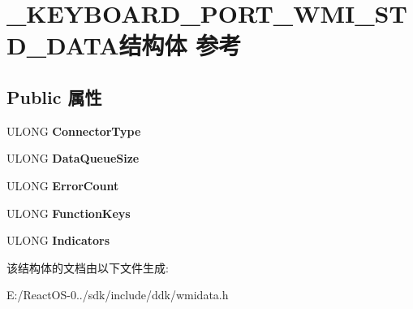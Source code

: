 \hypertarget{struct___k_e_y_b_o_a_r_d___p_o_r_t___w_m_i___s_t_d___d_a_t_a}{}\section{\+\_\+\+K\+E\+Y\+B\+O\+A\+R\+D\+\_\+\+P\+O\+R\+T\+\_\+\+W\+M\+I\+\_\+\+S\+T\+D\+\_\+\+D\+A\+T\+A结构体 参考}
\label{struct___k_e_y_b_o_a_r_d___p_o_r_t___w_m_i___s_t_d___d_a_t_a}
\subsection*{Public 属性}
\begin{DoxyCompactItemize}
\item 
\mbox{\label{struct___k_e_y_b_o_a_r_d___p_o_r_t___w_m_i___s_t_d___d_a_t_a_a283a1b687ed92957cd7f4bcb1a824111}} 
U\+L\+O\+NG {\bfseries Connector\+Type}
\item 
\mbox{\label{struct___k_e_y_b_o_a_r_d___p_o_r_t___w_m_i___s_t_d___d_a_t_a_ad8018be591bd409089619adbc71bda6f}} 
U\+L\+O\+NG {\bfseries Data\+Queue\+Size}
\item 
\mbox{\label{struct___k_e_y_b_o_a_r_d___p_o_r_t___w_m_i___s_t_d___d_a_t_a_a6e279cef1555fc63b3f31298583d58ad}} 
U\+L\+O\+NG {\bfseries Error\+Count}
\item 
\mbox{\label{struct___k_e_y_b_o_a_r_d___p_o_r_t___w_m_i___s_t_d___d_a_t_a_ad05319f3b59d1fa69b6386b633176ef6}} 
U\+L\+O\+NG {\bfseries Function\+Keys}
\item 
\mbox{\label{struct___k_e_y_b_o_a_r_d___p_o_r_t___w_m_i___s_t_d___d_a_t_a_aaff67e87ee5965de2827a883cbce94af}} 
U\+L\+O\+NG {\bfseries Indicators}
\end{DoxyCompactItemize}


该结构体的文档由以下文件生成\+:\begin{DoxyCompactItemize}
\item 
E\+:/\+React\+O\+S-\/0../sdk/include/ddk/wmidata.\+h\end{DoxyCompactItemize}
